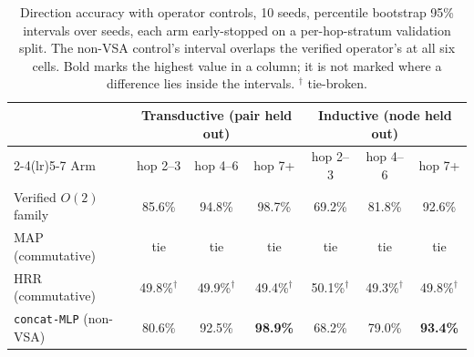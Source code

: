 \documentclass[10pt]{article}
\begin{document}
\begin{table}[t]
\centering
\caption{Direction accuracy with operator controls, 10 seeds, percentile bootstrap 95\% intervals over seeds, each arm early-stopped on a per-hop-stratum validation split. The non-VSA control's interval overlaps the verified operator's at all six cells. Bold marks the highest value in a column; it is not marked where a difference lies inside the intervals. $^\dagger$ tie-broken.}
\label{tab:controls}
\small
\begin{tabular}{lcccccc}
\toprule
& \multicolumn{3}{c}{Transductive (pair held out)} & \multicolumn{3}{c}{Inductive (node held out)} \\
\cmidrule(lr){2-4}\cmidrule(lr){5-7}
Arm & hop 2--3 & hop 4--6 & hop 7+ & hop 2--3 & hop 4--6 & hop 7+ \\
\midrule
Verified $O(2)$ family        & 85.6\% & 94.8\% & 98.7\% & 69.2\% & 81.8\% & 92.6\% \\
MAP (commutative)             & tie    & tie    & tie    & tie    & tie    & tie \\
HRR (commutative)             & 49.8\%$^\dagger$ & 49.9\%$^\dagger$ & 49.4\%$^\dagger$ & 50.1\%$^\dagger$ & 49.3\%$^\dagger$ & 49.8\%$^\dagger$ \\
\texttt{concat-MLP} (non-VSA) & 80.6\% & 92.5\% & \textbf{98.9\%} & 68.2\% & 79.0\% & \textbf{93.4\%} \\
\bottomrule
\end{tabular}
\end{table}
\end{document}
